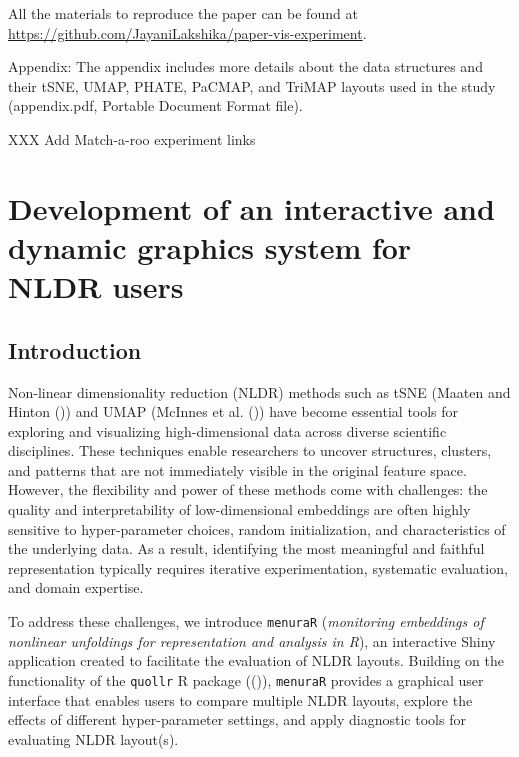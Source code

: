 \documentclass[
  11pt,
  a4paper,
]{report}
\begin{document}
All the materials to reproduce the paper can be found at
\url{https://github.com/JayaniLakshika/paper-vis-experiment}.

Appendix: The appendix includes more details about the data structures
and their tSNE, UMAP, PHATE, PaCMAP, and TriMAP layouts used in the
study (appendix.pdf, Portable Document Format file).

XXX Add Match-a-roo experiment links


\chapter{Development of an interactive and dynamic graphics system for
NLDR users}\label{sec-fifth-paper}

\section{Introduction}\label{introduction-4}

Non-linear dimensionality reduction (NLDR) methods such as tSNE (Maaten
and Hinton ()) and UMAP (McInnes et al.
()) have become essential tools for
exploring and visualizing high-dimensional data across diverse
scientific disciplines. These techniques enable researchers to uncover
structures, clusters, and patterns that are not immediately visible in
the original feature space. However, the flexibility and power of these
methods come with challenges: the quality and interpretability of
low-dimensional embeddings are often highly sensitive to hyper-parameter
choices, random initialization, and characteristics of the underlying
data. As a result, identifying the most meaningful and faithful
representation typically requires iterative experimentation, systematic
evaluation, and domain expertise.

To address these challenges, we introduce \texttt{menuraR}
(\emph{monitoring embeddings of nonlinear unfoldings for representation
and analysis in R}), an interactive Shiny application created to
facilitate the evaluation of NLDR layouts. Building on the functionality
of the \texttt{quollr} R package
(()), \texttt{menuraR}
provides a graphical user interface that enables users to compare
multiple NLDR layouts, explore the effects of different hyper-parameter
settings, and apply diagnostic tools for evaluating NLDR layout(s).
\end{document}
